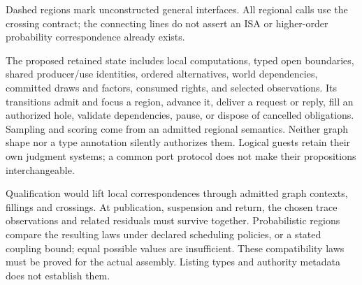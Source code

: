 \documentclass[11pt,a4paper]{article}
\newcommand{\diagramcaption}[1]{\par{\small\color{ink}#1\par}\medskip}
\begin{document}
\begin{center}
\end{center}
\diagramcaption{Dashed regions mark unconstructed general interfaces. All regional
calls use the crossing contract; the connecting lines do not assert an ISA or
higher-order probability correspondence already exists.}

The proposed retained state includes local computations, typed open boundaries,
shared producer/use identities, ordered alternatives, world dependencies,
committed draws and factors, consumed rights, and selected observations.
Its transitions admit and focus a region, advance it, deliver a request or
reply, fill an authorized hole, validate dependencies, pause, or dispose of
cancelled obligations. Sampling and scoring come from an admitted regional
semantics. Neither graph shape nor a type annotation silently authorizes them.
Logical guests retain their own judgment systems; a common port protocol
does not make their propositions interchangeable.

Qualification would lift local correspondences through admitted graph
contexts, fillings and crossings. At publication, suspension and return,
the chosen trace observations and related residuals must survive together.
Probabilistic regions compare the resulting laws under declared scheduling
policies, or a stated coupling bound; equal possible values are insufficient.
These compatibility laws must be proved for the actual assembly. Listing
types and authority metadata does not establish them.
\end{document}
